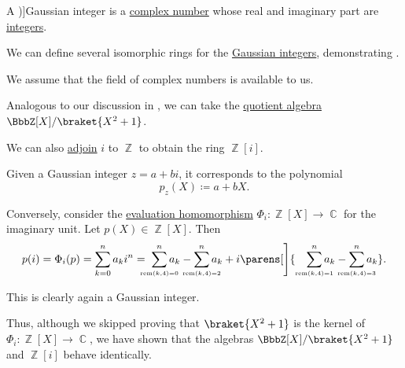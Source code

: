 \begin{definition}\label{def:gaussian_integers}
  A \term[ru=целые гауссовые числа (\cite[example 3.5.1]{Винберг2014Алгебра})]{Gaussian integer} is a \hyperref[def:complex_numbers]{complex number} whose real and imaginary part are \hyperref[def:integers]{integers}.
\end{definition}

\begin{example}\label{ex:gaussian_integers}
  We can define several isomorphic rings for the \hyperref[def:gaussian_integers]{Gaussian integers}, demonstrating .

  We assume that the field of complex numbers is available to us.

  \begin{thmenum}
     Analogous to our discussion in , we can take the \hyperref[def:algebra_over_ring/quotient]{quotient algebra} \( \BbbZ[X] / \braket{X^2 + 1} \).

     We can also \hyperref[def:semiring_adjunction]{adjoin} \( i \) to \( \BbbZ \) to obtain the ring \( \BbbZ[i] \).

    Given a Gaussian integer \( z = a + bi \), it corresponds to the polynomial
    \begin{equation*}
      p_z(X) \coloneqq a + bX.
    \end{equation*}

    Conversely, consider the \hyperref[con:evaluation_homomorphism]{evaluation homomorphism} \( \Phi_i: \BbbZ[X] \to \BbbC \) for the imaginary unit. Let \( p(X) \in \BbbZ[X] \). Then
    \begin{equation*}
      p(i)
      =
      \Phi_i(p)
      =
      \sum_{k=0}^n a_k i^n
      =
      \thickspace \sum_{\scriptscriptstyle{\mathclap{\rem(k, 4) = 0}}}^n a_k - \sum_{\scriptscriptstyle{\mathclap{\rem(k, 4) = 2}}}^n a_k + i \parens[\Bigg]{ \quad \sum_{\scriptscriptstyle{\mathclap{\rem(k, 4) = 1}}}^n a_k - \sum_{\scriptscriptstyle{\mathclap{\rem(k, 4) = 3}}}^n a_k }.
    \end{equation*}

    This is clearly again a Gaussian integer.

    Thus, although we skipped proving that \( \braket{X^2 + 1} \) is the kernel of \( \Phi_i: \BbbZ[X] \to \BbbC \), we have shown that the algebras \( \BbbZ[X] / \braket{ X^2 + 1 } \) and \( \BbbZ[i] \) behave identically.
  \end{thmenum}
\end{example}

